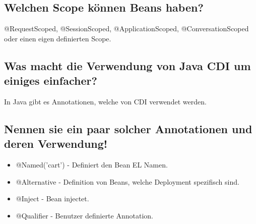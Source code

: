 \subsection{Welchen Scope können Beans haben?}
@RequestScoped, @SessionScoped, @ApplicationScoped, @ConversationScoped oder einen eigen definierten Scope.

\subsection{Was macht die Verwendung von Java CDI um einiges einfacher?}
In Java gibt es Annotationen, welche von CDI verwendet werden.

\subsection{Nennen sie ein paar solcher Annotationen und deren Verwendung!}
\begin{itemize}
	\item @Named('cart') - Definiert den Bean EL Namen.
	\item @Alternative - Definition von Beans, welche Deployment spezifisch sind.	
	\item @Inject - Bean injectet.
	\item @Qualifier - Benutzer definierte Annotation.
\end{itemize}